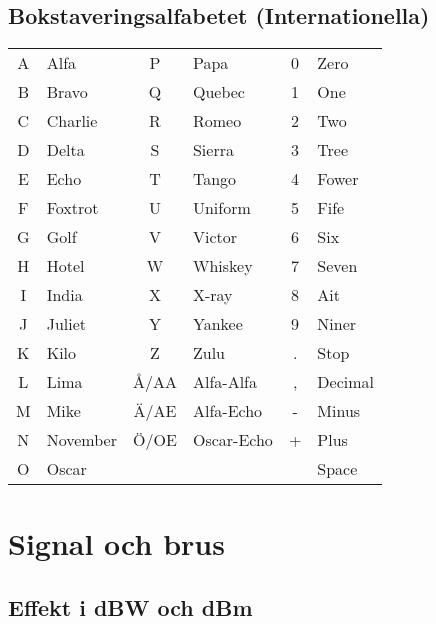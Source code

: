 \subsection{Bokstaveringsalfabetet (Internationella)}
\begin{center}
\begin{tabular}{cl|cl|cl}
	A & Alfa     &  P   & Papa       & 0 & Zero    \\
	B & Bravo    &  Q   & Quebec     & 1 & One     \\
	C & Charlie  &  R   & Romeo      & 2 & Two     \\
	D & Delta    &  S   & Sierra     & 3 & Tree    \\
	E & Echo     &  T   & Tango      & 4 & Fower   \\
	F & Foxtrot  &  U   & Uniform    & 5 & Fife    \\
	G & Golf     &  V   & Victor     & 6 & Six     \\
	H & Hotel    &  W   & Whiskey    & 7 & Seven   \\
	I & India    &  X   & X-ray      & 8 & Ait     \\
	J & Juliet   &  Y   & Yankee     & 9 & Niner   \\
	K & Kilo     &  Z   & Zulu       & . & Stop    \\
	L & Lima     & Å/AA & Alfa-Alfa  & , & Decimal \\
	M & Mike     & Ä/AE & Alfa-Echo  & - & Minus   \\
	N & November & Ö/OE & Oscar-Echo & + & Plus    \\
	O & Oscar    &      &            &   & Space
\end{tabular}
\end{center}

\section{Signal och brus}

\subsection{Effekt i dBW och dBm}

